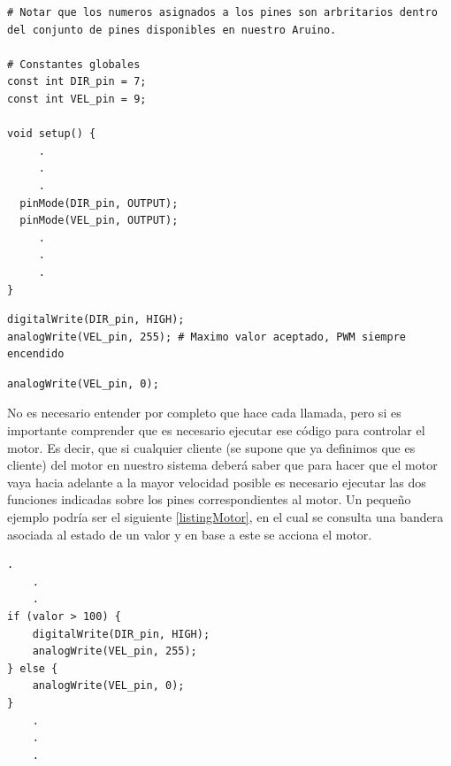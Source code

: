 \begin{lstlisting}[caption=Configuración inicial,label={listing1}]
# Notar que los numeros asignados a los pines son arbritarios dentro del conjunto de pines disponibles en nuestro Aruino.

# Constantes globales
const int DIR_pin = 7;
const int VEL_pin = 9;

void setup() {
     .
     .
     .
  pinMode(DIR_pin, OUTPUT);
  pinMode(VEL_pin, OUTPUT);
     .
     .
     .
}
\end{lstlisting}

\begin{lstlisting}[caption=Máxima velocidad giro horario,label={codigoMax}]
digitalWrite(DIR_pin, HIGH);
analogWrite(VEL_pin, 255); # Maximo valor aceptado, PWM siempre encendido
\end{lstlisting}

\begin{lstlisting}[caption=Detenerce, label={codigoDet}]
analogWrite(VEL_pin, 0);
\end{lstlisting}

No es necesario entender por completo que hace cada llamada, pero si es importante comprender que es necesario ejecutar ese código para controlar el motor. Es decir, que si cualquier cliente (se supone que ya definimos que es cliente) del motor en nuestro sistema deberá saber que para hacer que el motor vaya hacia adelante a la mayor velocidad posible es necesario ejecutar las dos funciones indicadas sobre los pines correspondientes al motor. Un pequeño ejemplo podría ser el siguiente \ref{listingMotor}, en el cual se consulta una bandera asociada al estado de un valor y en base a este se acciona el motor.

\begin{lstlisting}[caption=Ejemplo uso del motor,label={listingMotor}]
    .
    .
    .
if (valor > 100) {
    digitalWrite(DIR_pin, HIGH);
    analogWrite(VEL_pin, 255);
} else {
    analogWrite(VEL_pin, 0);
}
    .
    .
    .
\end{lstlisting}

